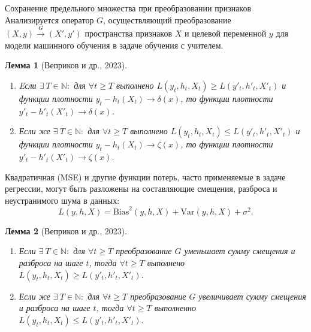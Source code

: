 \documentclass[aspectratio=169]{beamer}
\newtheorem{lemma_rus}{Лемма}
\begin{document}
    \begin{frame}{Сохранение предельного множества при преобразовании признаков}
        \footnotesize
        Анализируется оператор $G$, осуществляющий преобразование $(X, y) \overset{G}{\to} (X', y')$ пространства признаков $X$ и целевой переменной $y$ для модели машинного обучения в задаче обучения с учителем. 
        \vspace{-2mm}
        \begin{lemma_rus}[Веприков и др., 2023]
        \label{lemma_1}
        \vspace{-2mm}
            \begin{enumerate}
                \item  
                Eсли $\exists~ T \in \mathbb{N} : $ для $\forall t \geq T$ выполнено $L(y_t, h_t, X_t) \geq L(y'_t, h'_t, X'_t)$ и функции плотности $y_t-h_t(X_t) \to \delta(x)$, то функции плотности $y'_t-h'_t(X'_t) \to \delta(x)$.
            
	           \item 
                Если же $\exists~ T \in \mathbb{N} : $ для $\forall t \geq T$ выполнено $L(y_t, h_t, X_t) \leq L(y'_t, h'_t, X'_t)$ и функции плотности $y_t-h_t(X_t) \to \zeta(x)$, то функции плотности $y'_t-h'_t(X'_t) \to \zeta(x)$.
           \end{enumerate}
        \end{lemma_rus}
        Квадратичная (MSE) и другие функции потерь, часто применяемые в задаче регрессии, могут быть разложены на составляющие смещения, разброса и неустранимого шума в данных: 
        $$L(y, h, X) = \text{Bias}^2(y, h, X) + \text{Var}(y, h, X) + \sigma^2.$$
        \vspace{-7mm}
        \begin{lemma_rus}[Веприков и др., 2023]
        \label{lemma_2}
        \vspace{-2mm}
            \begin{enumerate}
                \item Если $\exists~ T \in \mathbb{N} : $ для $\forall t \geq T$ преобразование $G$ уменьшает сумму смещения и разброса на шаге $t$, тогда $\forall t \geq T$ выполнено $L(y_t, h_t, X_t) \geq L(y'_t, h'_t, X'_t).$

                \item Если же $\exists~ T \in \mathbb{N} : $ для $\forall t \geq T$ преобразование $G$ увеличивает сумму смещения и разброса на шаге $t$, тогда $\forall t \geq T$ выполненно $L(y_t, h_t, X_t) \leq L(y'_t, h'_t, X'_t).$
            \end{enumerate}
        \end{lemma_rus}

    \end{frame}
\end{document}
